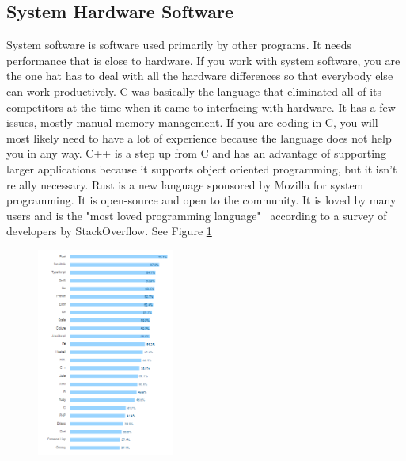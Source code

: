 \documentclass[letterpaper, 10 pt, conference]{IEEEtran}
\begin{document}
\subsection{System Hardware Software}
\indent System software is software used primarily by other programs. It needs performance that is close to hardware. If you work with system software, you are the one hat has to deal with all the hardware differences so that everybody else can work productively. C was basically the language that eliminated all of its competitors at the time when it came to interfacing with hardware. It has a few issues, mostly manual memory management. If you are coding in C, you will most likely need to have a lot of experience because the language does not help you in any way. C++ is a step up from C and has an advantage of supporting larger applications because it supports object oriented programming, but it isn't re ally necessary. Rust is a new language sponsored by Mozilla for system programming. It is open-source and open to the community. It is loved by many users and is the "most loved programming language"~\cite{Stats} according to a survey of developers by StackOverflow. See Figure \ref{fig:Most Loved}
\begin{figure} [!ht]
\centering
\includegraphics[width=0.4\textwidth]{mostLoved.png}
\caption{}
\label{fig:Most Loved}
\end{figure}
\newline
\end{document}
